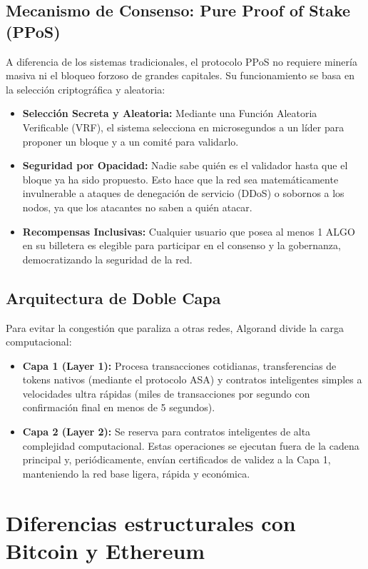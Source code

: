 \documentclass[12pt]{article}
\begin{document}
\subsection{Mecanismo de Consenso: Pure Proof of Stake (PPoS)}
A diferencia de los sistemas tradicionales, el protocolo PPoS no requiere minería masiva ni el bloqueo forzoso de grandes capitales. Su funcionamiento se basa en la selección criptográfica y aleatoria:
\begin{itemize}
    \item \textbf{Selección Secreta y Aleatoria:} Mediante una Función Aleatoria Verificable (VRF), el sistema selecciona en microsegundos a un líder para proponer un bloque y a un comité para validarlo.
    \item \textbf{Seguridad por Opacidad:} Nadie sabe quién es el validador hasta que el bloque ya ha sido propuesto. Esto hace que la red sea matemáticamente invulnerable a ataques de denegación de servicio (DDoS) o sobornos a los nodos, ya que los atacantes no saben a quién atacar.
    \item \textbf{Recompensas Inclusivas:} Cualquier usuario que posea al menos 1 ALGO en su billetera es elegible para participar en el consenso y la gobernanza, democratizando la seguridad de la red.
\end{itemize}

\subsection{Arquitectura de Doble Capa}
Para evitar la congestión que paraliza a otras redes, Algorand divide la carga computacional:
\begin{itemize}
    \item \textbf{Capa 1 (Layer 1):} Procesa transacciones cotidianas, transferencias de tokens nativos (mediante el protocolo ASA) y contratos inteligentes simples a velocidades ultra rápidas (miles de transacciones por segundo con confirmación final en menos de 5 segundos).
    \item \textbf{Capa 2 (Layer 2):} Se reserva para contratos inteligentes de alta complejidad computacional. Estas operaciones se ejecutan fuera de la cadena principal y, periódicamente, envían certificados de validez a la Capa 1, manteniendo la red base ligera, rápida y económica.
\end{itemize}

\section{Diferencias estructurales con Bitcoin y Ethereum}
\end{document}
